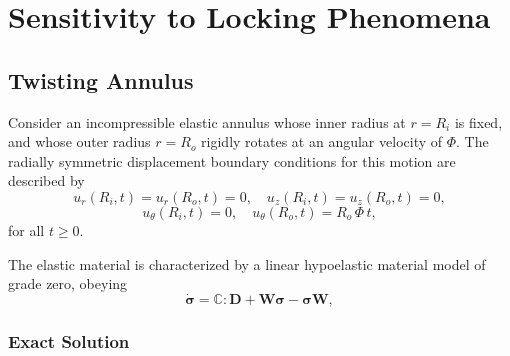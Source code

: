 \section{Sensitivity to Locking Phenomena}

\subsection*{Twisting Annulus}

Consider an incompressible elastic annulus whose inner radius at $r = R_i$ is fixed, and whose outer radius $r = R_o$ rigidly rotates at an angular velocity of $\Phi$. The radially symmetric displacement boundary conditions for this motion are described by
\begin{equation}
	u_r (R_i,t) = u_r (R_o,t) = 0, \quad u_z (R_i,t) = u_z (R_o,t) = 0,
\end{equation}
\begin{equation}
	u_\theta (R_i,t) = 0, \quad u_\theta (R_o,t) = R_o \, \Phi \, t,
\end{equation}
for all $t \geq 0$.

The elastic material is characterized by a linear hypoelastic material model of grade zero, obeying
\begin{equation}
  \dot{\boldsymbol{\sigma}} = \mathbb{C} : \mathbf{D} + \mathbf{W} \boldsymbol{\sigma} - \boldsymbol{\sigma} \mathbf{W},
\end{equation}

\subsubsection*{Exact Solution}

